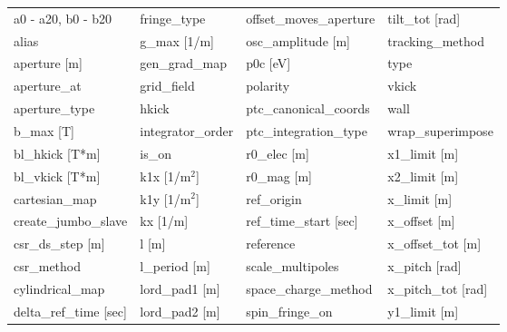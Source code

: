  \begin{tabular}{llll} \toprule
a0 - a20, b0 - b20               & fringe_type                      & offset_moves_aperture            & tilt_tot [rad]                   \\
alias                            & g_max [1/m]                      & osc_amplitude [m]                & tracking_method                  \\
aperture [m]                     & gen_grad_map                     & p0c [eV]                         & type                             \\
aperture_at                      & grid_field                       & polarity                         & vkick                            \\
aperture_type                    & hkick                            & ptc_canonical_coords             & wall                             \\
b_max [T]                        & integrator_order                 & ptc_integration_type             & wrap_superimpose                 \\
bl_hkick [T*m]                   & is_on                            & r0_elec [m]                      & x1_limit [m]                     \\
bl_vkick [T*m]                   & k1x [1/m$^2$]                    & r0_mag [m]                       & x2_limit [m]                     \\
cartesian_map                    & k1y [1/m$^2$]                    & ref_origin                       & x_limit [m]                      \\
create_jumbo_slave               & kx [1/m]                         & ref_time_start [sec]             & x_offset [m]                     \\
csr_ds_step [m]                  & l [m]                            & reference                        & x_offset_tot [m]                 \\
csr_method                       & l_period [m]                     & scale_multipoles                 & x_pitch [rad]                    \\
cylindrical_map                  & lord_pad1 [m]                    & space_charge_method              & x_pitch_tot [rad]                \\
delta_ref_time [sec]             & lord_pad2 [m]                    & spin_fringe_on                   & y1_limit [m]                     \\

\end{tabular}
